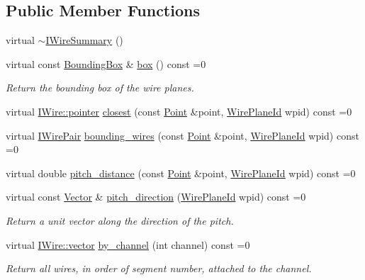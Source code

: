 \subsection*{Public Member Functions}
\begin{DoxyCompactItemize}
\item 
virtual \hyperlink{class_wire_cell_1_1_i_wire_summary_add8f74cd11ca13a3d91d8ae3bc9bfca4}{$\sim$\+I\+Wire\+Summary} ()
\item 
virtual const \hyperlink{class_wire_cell_1_1_bounding_box}{Bounding\+Box} \& \hyperlink{class_wire_cell_1_1_i_wire_summary_a58909d3b43592b2633c9d4d9109c90fb}{box} () const =0
\begin{DoxyCompactList}\small\item\em Return the bounding box of the wire planes. \end{DoxyCompactList}\item 
virtual \hyperlink{class_wire_cell_1_1_i_data_aff870b3ae8333cf9265941eef62498bc}{I\+Wire\+::pointer} \hyperlink{class_wire_cell_1_1_i_wire_summary_aa3c27c8c001bfacb7b1eb55dc586fb9f}{closest} (const \hyperlink{namespace_wire_cell_ab2b2565fa6432efbb4513c14c988cda9}{Point} \&point, \hyperlink{class_wire_cell_1_1_wire_plane_id}{Wire\+Plane\+Id} wpid) const =0
\item 
virtual \hyperlink{namespace_wire_cell_ad5f0e75d8f0e885d9ae4e9154e812d76}{I\+Wire\+Pair} \hyperlink{class_wire_cell_1_1_i_wire_summary_a13c8567121a0ab3dc34f402eddd5f718}{bounding\+\_\+wires} (const \hyperlink{namespace_wire_cell_ab2b2565fa6432efbb4513c14c988cda9}{Point} \&point, \hyperlink{class_wire_cell_1_1_wire_plane_id}{Wire\+Plane\+Id} wpid) const =0
\item 
virtual double \hyperlink{class_wire_cell_1_1_i_wire_summary_ac84fc8bf80d707050bda62b0dc9355fd}{pitch\+\_\+distance} (const \hyperlink{namespace_wire_cell_ab2b2565fa6432efbb4513c14c988cda9}{Point} \&point, \hyperlink{class_wire_cell_1_1_wire_plane_id}{Wire\+Plane\+Id} wpid) const =0
\item 
virtual const \hyperlink{namespace_wire_cell_aa3c82d3ba85f032b0d278b7004846800}{Vector} \& \hyperlink{class_wire_cell_1_1_i_wire_summary_a7ed1cb880286717c269fa4fb9fcceec9}{pitch\+\_\+direction} (\hyperlink{class_wire_cell_1_1_wire_plane_id}{Wire\+Plane\+Id} wpid) const =0
\begin{DoxyCompactList}\small\item\em Return a unit vector along the direction of the pitch. \end{DoxyCompactList}\item 
virtual \hyperlink{class_wire_cell_1_1_i_data_ae1a9f863380499bb43f39fabb6276660}{I\+Wire\+::vector} \hyperlink{class_wire_cell_1_1_i_wire_summary_a145ad4b5e1099d7914754459cc3a5a41}{by\+\_\+channel} (int channel) const =0
\begin{DoxyCompactList}\small\item\em Return all wires, in order of segment number, attached to the channel. \end{DoxyCompactList}\end{DoxyCompactItemize}
